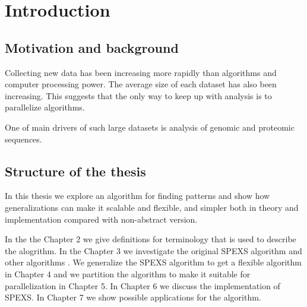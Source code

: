 \chapter{Introduction}


\section{Motivation and background}

Collecting new data has been increasing more rapidly than algorithms \insertref{} and
computer processing power. The average size of each dataset has also
been increasing. This suggests that the only way to keep up with
analysis is to parallelize algorithms.

One of main drivers of such large datasets is analysis
of genomic and proteomic sequences. 




\section{Structure of the thesis}

In this thesis we explore an algorithm for finding patterns and show how
generalizations can make it scalable and flexible, and simpler both in 
theory and implementation compared with non-abstract version.


In the the Chapter 2 we give definitions for terminology that is used to
describe the alogrithm. In the Chapter 3 we investigate the original
SPEXS algorithm \cite{spexs} and other algorithms . We generalize the SPEXS algorithm
to get a flexible algorithm in Chapter 4 and we partition the algorithm
to make it suitable for parallelization in Chapter 5. In Chapter 6 we
discuss the implementation of SPEXS. In Chapter 7 we show possible applications
for the algorithm.
